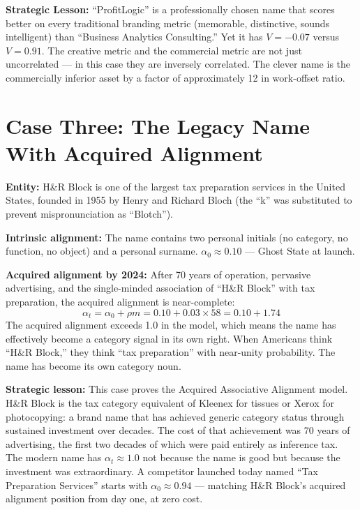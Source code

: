 \documentclass[12pt, openany]{book}
\theoremstyle{thmstyle}
\theoremstyle{defstyle}
\begin{document}
\begin{casebox}
\textbf{Strategic Lesson:} ``ProfitLogic'' is a professionally chosen name that scores better on every traditional branding metric (memorable, distinctive, sounds intelligent) than ``Business Analytics Consulting.'' Yet it has $V = -0.07$ versus $V = 0.91$. The creative metric and the commercial metric are not just uncorrelated --- in this case they are inversely correlated. The clever name is the commercially inferior asset by a factor of approximately 12 in work-offset ratio.
\end{casebox}

\section{Case Three: The Legacy Name With Acquired Alignment}

\begin{casebox}
\textbf{Entity:} H\&R Block is one of the largest tax preparation services in the United States, founded in 1955 by Henry and Richard Bloch (the ``k'' was substituted to prevent mispronunciation as ``Blotch'').

\textbf{Intrinsic alignment:} The name contains two personal initials (no category, no function, no object) and a personal surname. $\alpha_0 \approx 0.10$ --- Ghost State at launch.

\textbf{Acquired alignment by 2024:} After 70 years of operation, pervasive advertising, and the single-minded association of ``H\&R Block'' with tax preparation, the acquired alignment is near-complete:
\[
\alpha_t = \alpha_0 + \rho m = 0.10 + 0.03 \times 58 = 0.10 + 1.74
\]
The acquired alignment exceeds 1.0 in the model, which means the name has effectively become a category signal in its own right. When Americans think ``H\&R Block,'' they think ``tax preparation'' with near-unity probability. The name has become its own category noun.

\textbf{Strategic lesson:} This case proves the Acquired Associative Alignment model. H\&R Block is the tax category equivalent of Kleenex for tissues or Xerox for photocopying: a brand name that has achieved generic category status through sustained investment over decades. The cost of that achievement was 70 years of advertising, the first two decades of which were paid entirely as inference tax. The modern name has $\alpha_t \approx 1.0$ not because the name is good but because the investment was extraordinary. A competitor launched today named ``Tax Preparation Services'' starts with $\alpha_0 \approx 0.94$ --- matching H\&R Block's acquired alignment position from day one, at zero cost.
\end{casebox}
\end{document}
